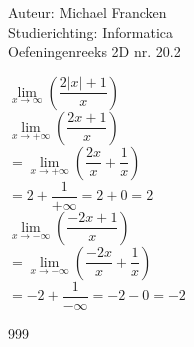 \documentclass[a4paper]{article}
\begin{document}
\noindent \large Auteur: Michael Francken \\
\noindent \large Studierichting: Informatica\\
\noindent \large Oefeningenreeks 2D nr. 20.2\\

\medskip

\normalsize

$\lim\limits_{x\rightarrow\infty}\left(\dfrac{2\lvert x\rvert+1}{x}\right)$\\


$\lim\limits_{x\rightarrow+\infty}\left( \dfrac{2x+1}{x}\right)$\\

$=\lim\limits_{x\rightarrow+\infty}\left(\dfrac{2x}{x} + \dfrac{1}{x}\right)$\\

$=2+\dfrac{1}{+\infty}=2+0=2$\\


$\lim\limits_{x\rightarrow-\infty}\left(\dfrac{-2x+1}{x}\right)$\\

$=\lim\limits_{x\rightarrow-\infty}\left(\dfrac{-2x}{x} + \dfrac{1}{x}\right)$\\

$=-2+\dfrac{1}{-\infty}=-2-0=-2$\\



\begin{thebibliography}{999}
\end{thebibliography}
\end{document}
